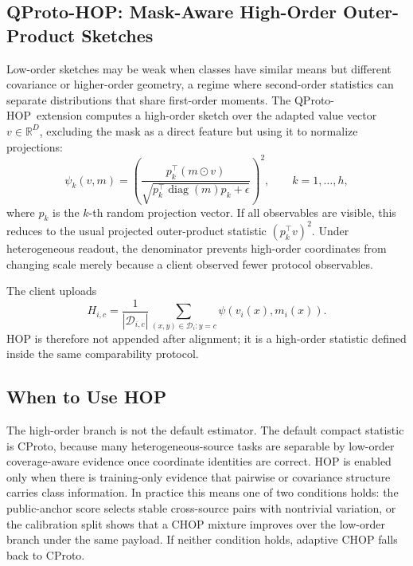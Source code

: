 \documentclass[preprint]{elsarticle}
\newcommand{\hopmethod}{QProto-HOP}
\newcommand{\R}{\mathbb{R}}
\newcommand{\cD}{\mathcal{D}}
\begin{document}
\subsection{\hopmethod: Mask-Aware High-Order Outer-Product Sketches}

Low-order sketches may be weak when classes have similar means but different covariance or higher-order geometry, a regime where second-order statistics can separate distributions that share first-order moments. The \hopmethod\ extension computes a high-order sketch over the adapted value vector \(v\in\R^D\), excluding the mask as a direct feature but using it to normalize projections:
\begin{equation}
    \psi_k(v,m)=
    \left(
    \frac{p_k^\top(m\odot v)}
    {\sqrt{p_k^\top \operatorname{diag}(m)p_k+\epsilon}}
    \right)^2,
    \qquad k=1,\ldots,h,
\end{equation}
where \(p_k\) is the \(k\)-th random projection vector. If all observables are visible, this reduces to the usual projected outer-product statistic \((p_k^\top v)^2\). Under heterogeneous readout, the denominator prevents high-order coordinates from changing scale merely because a client observed fewer protocol observables.

The client uploads
\begin{equation}
    H_{i,c} =
    \frac{1}{|\cD_{i,c}|}\sum_{(x,y)\in\cD_i:y=c}\psi(v_i(x),m_i(x)).
\end{equation}
HOP is therefore not appended after alignment; it is a high-order statistic defined inside the same comparability protocol.

\subsection{When to Use HOP}

The high-order branch is not the default estimator. The default compact statistic is CProto, because many heterogeneous-source tasks are separable by low-order coverage-aware evidence once coordinate identities are correct. HOP is enabled only when there is training-only evidence that pairwise or covariance structure carries class information. In practice this means one of two conditions holds: the public-anchor score selects stable cross-source pairs with nontrivial variation, or the calibration split shows that a CHOP mixture improves over the low-order branch under the same payload. If neither condition holds, adaptive CHOP falls back to CProto.
\end{document}
